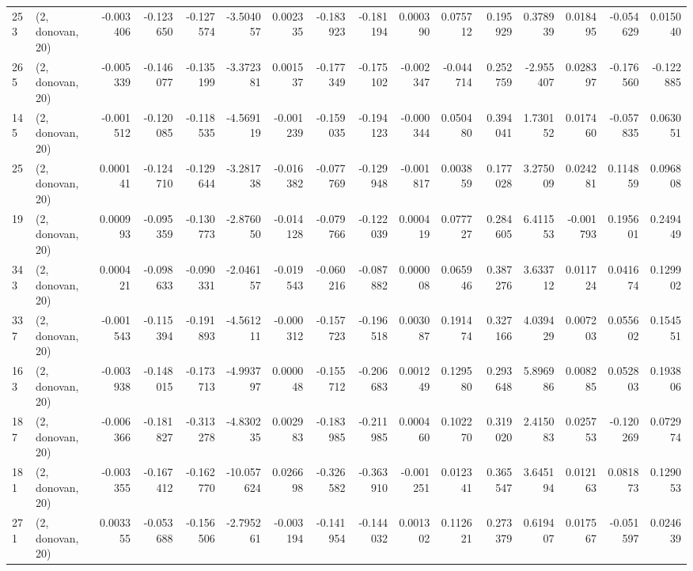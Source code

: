 \begin{tabular}{llrrrrrrrrrrrrrr}
253 &  (2, donovan, 20) &  -0.003406 & -0.123650 & -0.127574 &   -3.504057 &  0.002335 &  -0.183923 & -0.181194 &  0.000390 &  0.075712 &  0.195929 &    0.378939 &  0.018495 & -0.054629 &  0.015040 \\
265 &  (2, donovan, 20) &  -0.005339 & -0.146077 & -0.135199 &   -3.372381 &  0.001537 &  -0.177349 & -0.175102 & -0.002347 & -0.044714 &  0.252759 &   -2.955407 &  0.028397 & -0.176560 & -0.122885 \\
145 &  (2, donovan, 20) &  -0.001512 & -0.120085 & -0.118535 &   -4.569119 & -0.001239 &  -0.159035 & -0.194123 & -0.000344 &  0.050480 &  0.394041 &    1.730152 &  0.017460 & -0.057835 &  0.063051 \\
25  &  (2, donovan, 20) &   0.000141 & -0.124710 & -0.129644 &   -3.281738 & -0.016382 &  -0.077769 & -0.129948 & -0.001817 &  0.003859 &  0.177028 &    3.275009 &  0.024281 &  0.114859 &  0.096808 \\
19  &  (2, donovan, 20) &   0.000993 & -0.095359 & -0.130773 &   -2.876050 & -0.014128 &  -0.079766 & -0.122039 &  0.000419 &  0.077727 &  0.284605 &    6.411553 & -0.001793 &  0.195601 &  0.249449 \\
343 &  (2, donovan, 20) &   0.000421 & -0.098633 & -0.090331 &   -2.046157 & -0.019543 &  -0.060216 & -0.087882 &  0.000008 &  0.065946 &  0.387276 &    3.633712 &  0.011724 &  0.041674 &  0.129902 \\
337 &  (2, donovan, 20) &  -0.001543 & -0.115394 & -0.191893 &   -4.561211 & -0.000312 &  -0.157723 & -0.196518 &  0.003087 &  0.191474 &  0.327166 &    4.039429 &  0.007203 &  0.055602 &  0.154551 \\
163 &  (2, donovan, 20) &  -0.003938 & -0.148015 & -0.173713 &   -4.993797 &  0.000048 &  -0.155712 & -0.206683 &  0.001249 &  0.129580 &  0.293648 &    5.896986 &  0.008285 &  0.052803 &  0.193806 \\
187 &  (2, donovan, 20) &  -0.006366 & -0.181827 & -0.313278 &   -4.830235 &  0.002983 &  -0.183985 & -0.211985 &  0.000460 &  0.102270 &  0.319020 &    2.415083 &  0.025753 & -0.120269 &  0.072974 \\
181 &  (2, donovan, 20) &  -0.003355 & -0.167412 & -0.162770 &  -10.057624 &  0.026698 &  -0.326582 & -0.363910 & -0.001251 &  0.012341 &  0.365547 &    3.645194 &  0.012163 &  0.081873 &  0.129053 \\
271 &  (2, donovan, 20) &   0.003355 & -0.053688 & -0.156506 &   -2.795261 & -0.003194 &  -0.141954 & -0.144032 &  0.001302 &  0.112621 &  0.273379 &    0.619407 &  0.017567 & -0.051597 &  0.024639 \\

\end{tabular}
